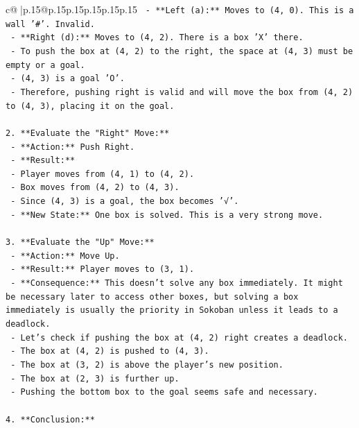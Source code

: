 \documentclass{article}
\begin{document}
{\begin{supertabular}{c@{$\;$}|p{.15\linewidth}@{}p{.15\linewidth}p{.15\linewidth}p{.15\linewidth}p{.15\linewidth}p{.15\linewidth}}
{{{\texttt{    {-} **Left (a):** Moves to (4, 0). This is a wall '\#'. Invalid.} \\
\texttt{    {-} **Right (d):** Moves to (4, 2). There is a box 'X' there.} \\
\texttt{        {-} To push the box at (4, 2) to the right, the space at (4, 3) must be empty or a goal.} \\
\texttt{        {-} (4, 3) is a goal 'O'.} \\
\texttt{        {-} Therefore, pushing right is valid and will move the box from (4, 2) to (4, 3), placing it on the goal.} \\
\\ 
\texttt{2.  **Evaluate the "Right" Move:**} \\
\texttt{    {-} **Action:** Push Right.} \\
\texttt{    {-} **Result:**} \\
\texttt{        {-} Player moves from (4, 1) to (4, 2).} \\
\texttt{        {-} Box moves from (4, 2) to (4, 3).} \\
\texttt{        {-} Since (4, 3) is a goal, the box becomes '√'.} \\
\texttt{    {-} **New State:** One box is solved. This is a very strong move.} \\
\\ 
\texttt{3.  **Evaluate the "Up" Move:**} \\
\texttt{    {-} **Action:** Move Up.} \\
\texttt{    {-} **Result:** Player moves to (3, 1).} \\
\texttt{    {-} **Consequence:** This doesn't solve any box immediately. It might be necessary later to access other boxes, but solving a box immediately is usually the priority in Sokoban unless it leads to a deadlock.} \\
\texttt{    {-} Let's check if pushing the box at (4, 2) right creates a deadlock.} \\
\texttt{        {-} The box at (4, 2) is pushed to (4, 3).} \\
\texttt{        {-} The box at (3, 2) is above the player's new position.} \\
\texttt{        {-} The box at (2, 3) is further up.} \\
\texttt{        {-} Pushing the bottom box to the goal seems safe and necessary.} \\
\\ 
\texttt{4.  **Conclusion:**} \\
}}}
\end{supertabular}}
\end{document}

